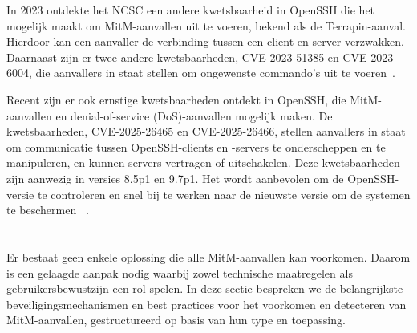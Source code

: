 In 2023 ontdekte het NCSC een andere kwetsbaarheid in OpenSSH die het mogelijk maakt om MitM-aanvallen uit te voeren, bekend als de Terrapin-aanval. Hierdoor kan een aanvaller de verbinding tussen een client en server verzwakken. Daarnaast zijn er twee andere kwetsbaarheden, CVE-2023-51385 en CVE-2023-6004, die aanvallers in staat stellen om ongewenste commando's uit te voeren~\autocite{NCSC2023}. 

Recent zijn er ook ernstige kwetsbaarheden ontdekt in OpenSSH, die MitM-aanvallen en denial-of-service (DoS)-aanvallen mogelijk maken. De kwetsbaarheden, CVE-2025-26465 en CVE-2025-26466, stellen aanvallers in staat om communicatie tussen OpenSSH-clients en -servers te onderscheppen en te manipuleren, en kunnen servers vertragen of uitschakelen. Deze kwetsbaarheden zijn aanwezig in versies 8.5p1 en 9.7p1. Het wordt aanbevolen om de OpenSSH-versie te controleren en snel bij te werken naar de nieuwste versie om de systemen te beschermen ~\autocite{linuxsecurity2025}.



\section{}
\label{sec:Hoe bescherm je jezelf tegen MitM-aanvallen?}



Er bestaat geen enkele oplossing die alle MitM-aanvallen kan voorkomen. Daarom is een gelaagde aanpak nodig waarbij zowel technische maatregelen als gebruikersbewustzijn een rol spelen. In deze sectie bespreken we de belangrijkste beveiligingsmechanismen en best practices voor het voorkomen en detecteren van MitM-aanvallen, gestructureerd op basis van hun type en toepassing.

